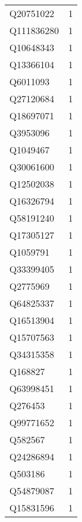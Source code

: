 \begin{tabular}{lr}
   Q20751022 &                             1 \\
  Q111836280 &                             1 \\
   Q10648343 &                             1 \\
   Q13366104 &                             1 \\
    Q6011093 &                             1 \\
   Q27120684 &                             1 \\
   Q18697071 &                             1 \\
    Q3953096 &                             1 \\
    Q1049467 &                             1 \\
   Q30061600 &                             1 \\
   Q12502038 &                             1 \\
   Q16326794 &                             1 \\
   Q58191240 &                             1 \\
   Q17305127 &                             1 \\
    Q1059791 &                             1 \\
   Q33399405 &                             1 \\
    Q2775969 &                             1 \\
   Q64825337 &                             1 \\
   Q16513904 &                             1 \\
   Q15707563 &                             1 \\
   Q34315358 &                             1 \\
     Q168827 &                             1 \\
   Q63998451 &                             1 \\
     Q276453 &                             1 \\
   Q99771652 &                             1 \\
     Q582567 &                             1 \\
   Q24286894 &                             1 \\
     Q503186 &                             1 \\
   Q54879087 &                             1 \\
   Q15831596 &                             1 \\

\end{tabular}
